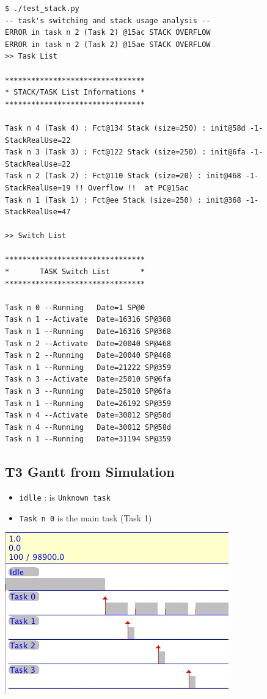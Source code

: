 \begin{verbatim}
$ ./test_stack.py 
-- task's switching and stack usage analysis --
ERROR in task n 2 (Task 2) @15ac STACK OVERFLOW
ERROR in task n 2 (Task 2) @15ae STACK OVERFLOW
>> Task List

********************************
* STACK/TASK List Informations *
********************************

Task n 4 (Task 4) : Fct@134 Stack (size=250) : init@58d -1- StackRealUse=22
Task n 3 (Task 3) : Fct@122 Stack (size=250) : init@6fa -1- StackRealUse=22
Task n 2 (Task 2) : Fct@110 Stack (size=20) : init@468 -1- StackRealUse=19 !! Overflow !!  at PC@15ac
Task n 1 (Task 1) : Fct@ee Stack (size=250) : init@368 -1- StackRealUse=47

>> Switch List

********************************
*       TASK Switch List       *
********************************

Task n 0 --Running   Date=1 SP@0
Task n 1 --Activate  Date=16316 SP@368
Task n 1 --Running   Date=16316 SP@368
Task n 2 --Activate  Date=20040 SP@468
Task n 2 --Running   Date=20040 SP@468
Task n 1 --Running   Date=21222 SP@359
Task n 3 --Activate  Date=25010 SP@6fa
Task n 3 --Running   Date=25010 SP@6fa
Task n 1 --Running   Date=26192 SP@359
Task n 4 --Activate  Date=30012 SP@58d
Task n 4 --Running   Date=30012 SP@58d
Task n 1 --Running   Date=31194 SP@359
\end{verbatim}

\subsection{T3 Gantt from Simulation}

 \begin{itemize}
	\item {\tt  idlle} : is {\tt Unknown task}
	\item  {\tt Task n 0} is the main task (Task 1)
\end{itemize}

 \includegraphics[width=0.8 \linewidth]{../common/images/appendixBSExampleStackAnalysisGantt.jpg}

